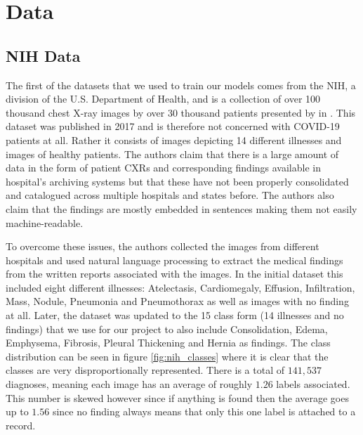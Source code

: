 \chapter{Data}\label{chapter:data}

\section{NIH Data}\label{data:nih}

The first of the datasets that we used to train our models comes from the \acf{NIH}, a division of the U.S. Department of Health, and is a collection of over 100 thousand chest X-ray images by over 30 thousand patients presented by \citeauthor{wang_chestx-ray8_2017} in \autocite{wang_chestx-ray8_2017}. This dataset was published in 2017 and is therefore not concerned with COVID-19 patients at all. Rather it consists of images depicting 14 different illnesses and images of healthy patients. The authors claim that there is a large amount of data in the form of patient \acp{CXR} and corresponding findings available in hospital's archiving systems but that these have not been properly consolidated and catalogued across multiple hospitals and states before. The authors also claim that the findings are mostly embedded in sentences making them not easily machine-readable.

To overcome these issues, the authors collected the images from different hospitals and used natural language processing to extract the medical findings from the written reports associated with the images. In the initial dataset this included eight different illnesses: Atelectasis, Cardiomegaly, Effusion, Infiltration, Mass, Nodule, Pneumonia and Pneumothorax as well as images with no finding at all. Later, the dataset was updated to the 15 class form (14 illnesses and no findings) that we use for our project to also include Consolidation, Edema, Emphysema, Fibrosis, Pleural Thickening and Hernia as findings. The class distribution can be seen in figure \vref{fig:nih_classes} where it is clear that the classes are very disproportionally represented. There is a total of $141,537$ diagnoses, meaning each image has an average of roughly $1.26$ labels associated. This number is skewed however since if anything is found then the average goes up to $1.56$ since no finding always means that only this one label is attached to a record.

